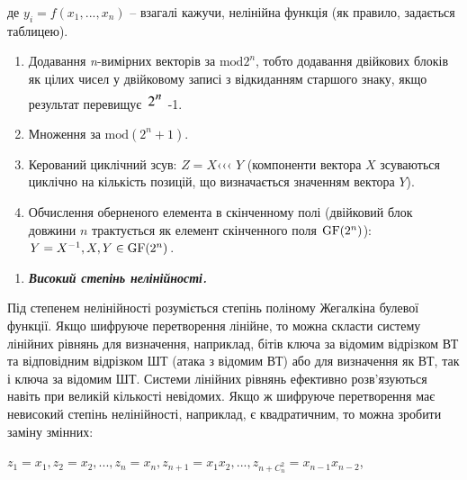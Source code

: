 \documentclass[a4paper]{article}
\newcounter{saveenum}
\newcommand\liststyleWWviiiNumxxxii{%
\renewcommand\theenumi{\arabic{enumi}}
\renewcommand\theenumii{\arabic{enumii}}
\renewcommand\theenumiii{\arabic{enumiii}}
\renewcommand\theenumiv{\arabic{enumiv}}
\renewcommand\labelenumi{\theenumi)}
\renewcommand\labelenumii{\theenumii.}
\renewcommand\labelenumiii{\theenumiii.}
\renewcommand\labelenumiv{\theenumiv.}
}
\newcommand\liststyleWWviiiNumxxxv{%
\renewcommand\theenumi{\arabic{enumi}}
\renewcommand\theenumii{\alph{enumii}}
\renewcommand\theenumiii{\roman{enumiii}}
\renewcommand\theenumiv{\arabic{enumiv}}
\renewcommand\labelenumi{\theenumi.}
\renewcommand\labelenumii{\theenumii.}
\renewcommand\labelenumiii{\theenumiii.}
\renewcommand\labelenumiv{\theenumiv.}
}
\newcounter{}
\newcommand\normalsubformula[1]{\text{\mathversion{normal}$#1$}}
\begin{document}
де  ${y_{{i}}=f(x_{{1}},\text{.}\text{.}\text{.},x_{{n}})}$ – взагалі кажучи,
нелінійна функція (як правило, задається таблицею).

\liststyleWWviiiNumxxxii
\setcounter{saveenum}{\value{enumi}}
\begin{enumerate}
\setcounter{enumi}{\value{saveenum}}
\item Додавання \textit{n}{}-вимірних векторів за  ${\text{mod}2^{{n}}}$, тобто
додавання двійкових блоків як цілих чисел у двійковому записі з відкиданням
старшого знаку, якщо результат перевищує 
\includegraphics[width=0.2083in,height=0.2362in]{crypt-img/crypt-img294.png}
{}-1. 
\item Множення за  ${\text{mod}(2^{{n}}+1)}$.
\item Керований циклічний зсув: \textbf{ } ${Z=X}$‹‹‹ ${Y}$ (компоненти вектора 
${X}$ зсуваються циклічно на кількість позицій, що визначається значенням
вектора ${Y}$).
\item Обчислення оберненого  елемента  в скінченному полі (двійковий блок
довжини  ${n}$ трактується як елемент скінченного поля 
${\normalsubformula{\text{GF}}(2^{{n}})}$):   ${Y=X^{{-1}},X,Y\in
\normalsubformula{\text{GF}}(2^{{n}})}$.
\end{enumerate}

\bigskip

\liststyleWWviiiNumxxxv
\begin{enumerate}
\item {\bfseries\itshape
Високий степінь нелінійності.}
\end{enumerate}
Під степенем нелінійності розуміється степінь поліному Жегалкіна булевої
функції. Якщо шифруюче перетворення лінійне, то можна скласти систему лінійних
рівнянь для визначення, наприклад, бітів ключа за відомим відрізком ВТ та
відповідним відрізком ШТ (атака з відомим ВТ) або для визначення як ВТ, так і
ключа за відомим ШТ. Системи лінійних рівнянь ефективно розв’язуються навіть
при великій кількості невідомих. Якщо ж шифруюче перетворення має невисокий
степінь нелінійності, наприклад, є квадратичним, то можна зробити заміну
змінних:

{\centering

${z_{{1}}=x_{{1}},z_{{2}}=x_{{2}},\text{.}\text{.}\text{.},z_{{n}}=x_{{n}},z_{{n+1}}=x_{{1}}x_{{2}},\text{.}\text{.}\text{.},z_{{n+C_{{n}}^{{2}}}}=x_{n-1}{x_{n-2}}}$,
\par}
\end{document}
